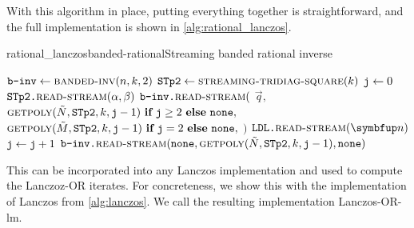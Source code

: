With this algorithm in place, putting everything together is straightforward, and the full implementation is shown in \cref{alg:rational_lanczos}.

\begin{labelalgorithm}[htb]{rational_lanczos}{banded-rational}{Streaming banded rational inverse}
\begin{algorithmic}[1]
\State $\texttt{b-inv} \gets \textsc{banded-inv}(n,k,2)$
\State $\texttt{STp2} \gets \textsc{streaming-tridiag-square}(k)$
\State $\texttt{j}\gets0$
    \State $\texttt{STp2.}\textsc{read-stream}(\alpha,\beta)$
    \State $\texttt{b-inv.}\textsc{read-stream}($
    \State \hspace{1em} $\vec{q},$
    \State \hspace{1em} $\textsc{getpoly}(\tilde{N},\texttt{STp2},k,\texttt{j}-1)~\textbf{if}~\texttt{j}\geq 2~\textbf{else}~\texttt{none},$
    \State \hspace{1em} $\textsc{getpoly}(\tilde{M},\texttt{STp2},k,\texttt{j}-1)~\textbf{if}~\texttt{j}= 2~\textbf{else}~\texttt{none},$
    \State$)$
\EndIf
\State $\ms{LDL.}\textsc{read-stream}(\vec{n})$
\State $\texttt{j}\gets \texttt{j}+1$
\EndProcedure
{}
    \State $\texttt{b-inv.}\textsc{read-stream}( \texttt{none}, \textsc{getpoly}(\tilde{N},\texttt{STp2},k,\texttt{j}-1), \texttt{none} )$
\EndFor
\EndProcedure
{}
\State \Return {}
\EndProcedure
\EndClass 
\end{algorithmic}
\end{labelalgorithm}

This can be incorporated into any Lanczos implementation and used to compute the Lanczoz-OR iterates.
For concreteness, we show this with the implementation of Lanczos from \cref{alg:lanczos}.
We call the resulting implementation Lanczos-OR-lm.

